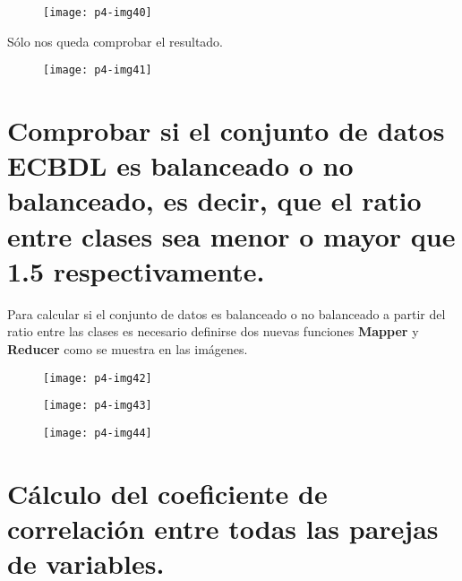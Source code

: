 \documentclass[10pt]{article}
\begin{document}
\begin{figure}[H]
	\begin{center}
 		\texttt{[image: p4-img40]}
	\end{center} 
\end{figure}

Sólo nos queda comprobar el resultado. \\

\begin{figure}[H]
	\begin{center}
 		\texttt{[image: p4-img41]}
	\end{center} 
\end{figure}


\section{Comprobar si el conjunto de datos ECBDL es balanceado o no balanceado, es decir, que el ratio entre clases sea menor o mayor que 1.5 respectivamente.} 
Para calcular si el conjunto de datos es balanceado o no balanceado a partir del ratio entre las clases es necesario definirse dos nuevas funciones \textbf{Mapper} y \textbf{Reducer} como se muestra en las imágenes. \\

\begin{figure}[H]
	\begin{center}
 		\texttt{[image: p4-img42]}
	\end{center} 
\end{figure}

\begin{figure}[H]
	\begin{center}
 		\texttt{[image: p4-img43]}
	\end{center} 
\end{figure}

\begin{figure}[H]
	\begin{center}
 		\texttt{[image: p4-img44]}
	\end{center} 
\end{figure}

\section{Cálculo del coeficiente de correlación entre todas las parejas de variables.} 
\end{document}
